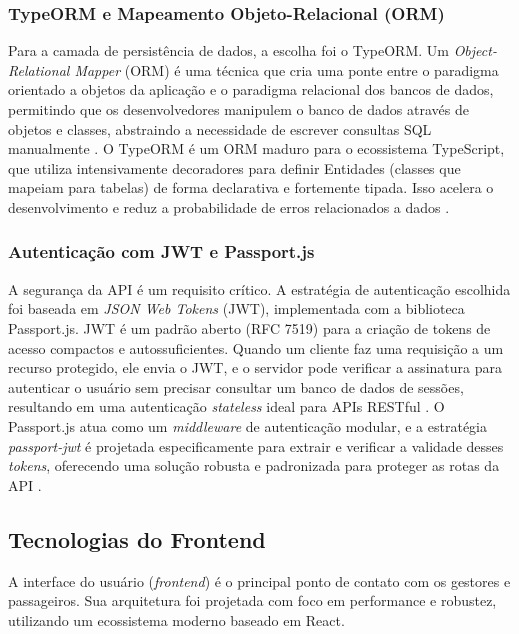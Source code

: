 \subsubsection{TypeORM e Mapeamento Objeto-Relacional (ORM)}
Para a camada de persistência de dados, a escolha foi o TypeORM. Um \textit{Object-Relational Mapper} (ORM) é uma técnica que cria uma ponte entre o paradigma orientado a objetos da aplicação e o paradigma relacional dos bancos de dados, permitindo que os desenvolvedores manipulem o banco de dados através de objetos e classes, abstraindo a necessidade de escrever consultas SQL manualmente \cite{logrocket2024typeorm}. O TypeORM é um ORM maduro para o ecossistema TypeScript, que utiliza intensivamente decoradores para definir Entidades (classes que mapeiam para tabelas) de forma declarativa e fortemente tipada. Isso acelera o desenvolvimento e reduz a probabilidade de erros relacionados a dados \cite{devto2024typeorm}.

\subsubsection{Autenticação com JWT e Passport.js}
A segurança da API é um requisito crítico. A estratégia de autenticação escolhida foi baseada em \textit{JSON Web Tokens} (JWT), implementada com a biblioteca Passport.js. JWT é um padrão aberto (RFC 7519) para a criação de tokens de acesso compactos e autossuficientes. Quando um cliente faz uma requisição a um recurso protegido, ele envia o JWT, e o servidor pode verificar a assinatura para autenticar o usuário sem precisar consultar um banco de dados de sessões, resultando em uma autenticação \textit{stateless} ideal para APIs RESTful \cite{soshace2024jwt}. O Passport.js atua como um \textit{middleware} de autenticação modular, e a estratégia \textit{passport-jwt} é projetada especificamente para extrair e verificar a validade desses \textit{tokens}, oferecendo uma solução robusta e padronizada para proteger as rotas da API \cite{passportjs2025jwt}.

\subsection{Tecnologias do Frontend}

A interface do usuário (\textit{frontend}) é o principal ponto de contato com os gestores e passageiros. Sua arquitetura foi projetada com foco em performance e robustez, utilizando um ecossistema moderno baseado em React.

